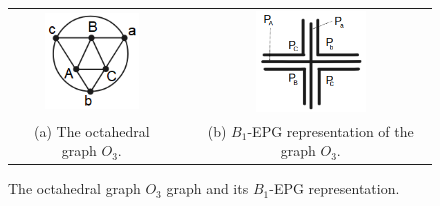 \begin{figure}[h]
  \centering
  
  \begin{tabular}{c p{1.3cm} c }
   \centering \includegraphics[width=2.5cm]{./img/octaedro} & &\includegraphics[width=2.9cm]{./img/representacaoOctaedro}  \\
    \footnotesize \centering (a) The octahedral  graph $O_{3}. $  & &  \footnotesize(b) $B_1$-EPG representation of the graph $O_3$.
  \end{tabular}

 \caption{The octahedral graph $O_3$ graph and its  $B_1$-EPG representation.}\label{fig:octaedro}
\end{figure}
 